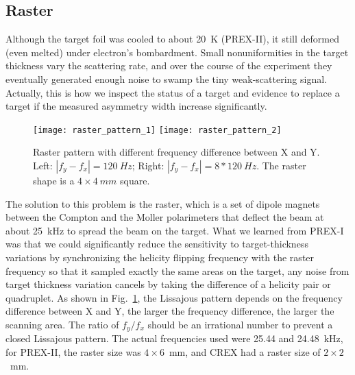\subsection{Raster}
Although the target foil was cooled to about 20~K (PREX-II), it still deformed (even melted)
under electron's bombardment. Small nonuniformities in the target 
thickness vary the scattering rate, and over the course of the experiment they 
eventually generated enough noise to swamp the tiny weak-scattering signal.
Actually, this is how we inspect the status of a target and evidence to
replace a target if the measured asymmetry width increase significantly.

\begin{figure}
    \centering
    \texttt{[image: raster\_pattern\_1]}
    \texttt{[image: raster\_pattern\_2]}
    \caption{Raster pattern with different frequency difference between X and Y.
    Left: $|f_y - f_x| = 120\ Hz$; Right: $|f_y - f_x| = 8*120\ Hz$. The raster
    shape is a $4\times 4\ mm$ square.} 
    \label{fig:raster_pattern}
\end{figure}

The solution to this problem is the raster, which is a set of dipole magnets %
between the Compton and the Moller polarimeters
that deflect the beam at about 25~kHz to spread the beam on the target.
What we learned from PREX-I was that we could significantly reduce the sensitivity 
to target-thickness variations by synchronizing the helicity flipping frequency
with the raster frequency so that it sampled exactly the same areas on the target,
any noise from target thickness variation cancels by taking the difference of
a helicity pair or quadruplet. 
As shown in Fig.~\ref{fig:raster_pattern}, the Lissajous pattern depends
on the frequency difference between X and Y, the larger the frequency difference,
the larger the scanning area. The ratio of $f_y/f_x$ should be an irrational number
to prevent a closed Lissajous pattern. The actual frequencies used were 25.44
and 24.48~kHz, for PREX-II, the raster size was $4 \times 6$~mm, and CREX
had a raster size of $2 \times 2$~mm.

